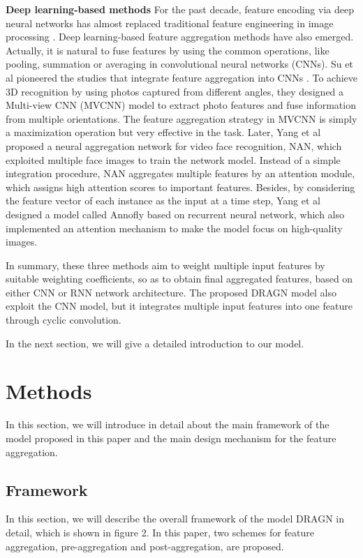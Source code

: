 \documentclass[10pt,twocolumn,letterpaper]{article}
\begin{document}
\textbf{Deep learning-based methods} For the past decade, feature encoding via deep neural networks has almost replaced traditional feature engineering in image processing \cite{ref16, ref19, ref20}. Deep learning-based feature aggregation methods have also emerged. Actually, it is natural to fuse features by using the common operations, like pooling, summation or averaging in convolutional neural networks (CNNs). Su et al pioneered the studies that integrate feature aggregation into CNNs \cite{ref23}. To achieve 3D recognition by using photos captured from different angles, they designed a Multi-view CNN (MVCNN) model to extract photo features and fuse information from multiple orientations. The feature aggregation strategy in MVCNN is simply a maximization operation but very effective in the task. Later, Yang et al proposed a neural aggregation network for video face recognition, NAN\cite{ref24}, which exploited multiple face images to train the network model. Instead of a simple integration procedure, NAN aggregates multiple features by an attention module, which assigns high attention scores to important features.
Besides, by considering the feature vector of each instance as the input at a time step, Yang et al designed a model called Annofly \cite{annofly} based on recurrent neural network, which also implemented an attention mechanism to make the model focus on high-quality images.

In summary, these three methods aim to weight multiple input features by suitable weighting coefficients, so as to obtain final aggregated features, based on either CNN or RNN network architecture. The proposed DRAGN model also exploit the CNN model, but it integrates multiple input features into one feature through cyclic convolution.



In the next section, we will give a detailed introduction to our model.

\section{Methods}
In this section, we will introduce in detail about the main framework of the model proposed in this paper and the main design mechanism for the feature aggregation.

\subsection{Framework}
In this section, we will describe the overall framework of the model DRAGN in detail, which is shown in figure 2. In this paper, two schemes for feature aggregation, pre-aggregation and post-aggregation, are proposed.
\end{document}
